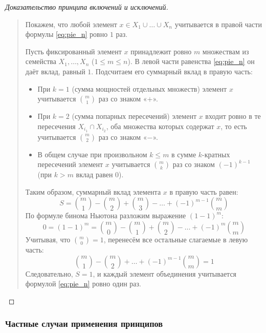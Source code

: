 \begin{proof}[Доказательство принципа включений и исключений]~\\
    \begin{quote}
        Покажем, что любой элемент $x \in X_1 \cup \dots \cup X_n$ 
        учитывается в правой части формулы \eqref{eq:pie_n} ровно $1$ раз.

        Пусть фиксированный элемент $x$ принадлежит ровно $m$ множествам из 
        семейства $X_1, \dots, X_n$ ($1 \le m \le n$). В левой части 
        равенства \eqref{eq:pie_n} он даёт вклад, равный $1$. Подсчитаем 
        его суммарный вклад в правую часть:
        \begin{itemize}
            \item При $k = 1$ (сумма мощностей отдельных множеств) элемент 
            $x$ учитывается $\binom{m}{1}$ раз со знаком «$+$».
            \item При $k = 2$ (сумма попарных пересечений) элемент $x$ 
            входит ровно в те пересечения $X_{i_1} \cap X_{i_2}$, оба 
            множества которых содержат $x$, то есть учитывается 
            $\binom{m}{2}$ раз со знаком «$-$».
            \item В общем случае при произвольном $k \le m$ в сумме 
            $k$-кратных пересечений элемент $x$ учитывается $\binom{m}{k}$ 
            раз со знаком $(-1)^{k-1}$ (при $k > m$ вклад равен $0$).
        \end{itemize}
        Таким образом, суммарный вклад элемента $x$ в правую часть равен:
        \[
            S = \binom{m}{1} - \binom{m}{2} + \binom{m}{3} - \dots + 
            (-1)^{m-1} \binom{m}{m}
        \]
        По формуле бинома Ньютона разложим выражение $(1 - 1)^m$:
        \[
            0 = (1 - 1)^m = \binom{m}{0} - \binom{m}{1} + \binom{m}{2} - 
            \dots + (-1)^m \binom{m}{m}
        \]
        Учитывая, что $\binom{m}{0} = 1$, перенесём все остальные слагаемые 
        в левую часть:
        \[
            \binom{m}{1} - \binom{m}{2} + \dots + (-1)^{m-1} \binom{m}{m} = 1
        \]
        Следовательно, $S = 1$, и каждый элемент объединения учитывается 
        формулой \eqref{eq:pie_n} ровно один раз.
    \end{quote}
\end{proof}

\subsubsection{Частные случаи применения принципов}

